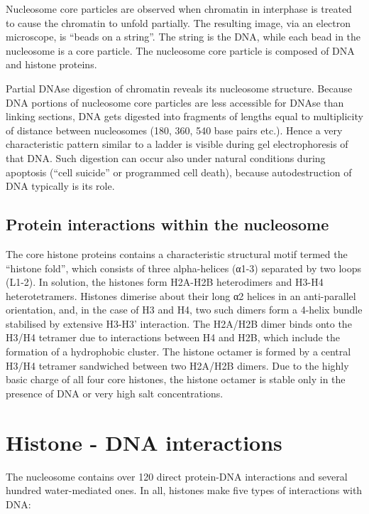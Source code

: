 Nucleosome core particles are observed when chromatin in interphase is treated to cause the chromatin to unfold partially. The resulting image, via an electron microscope, is ``beads on a string''. The string is the DNA, while each bead in the nucleosome is a core particle. The nucleosome core particle is composed of DNA and histone proteins.

Partial DNAse digestion of chromatin reveals its nucleosome structure. Because DNA portions of nucleosome core particles are less accessible for DNAse than linking sections, DNA gets digested into fragments of lengths equal to multiplicity of distance between nucleosomes (180, 360, 540 base pairs etc.). Hence a very characteristic pattern similar to a ladder is visible during gel electrophoresis of that DNA. Such digestion can occur also under natural conditions during apoptosis (``cell suicide'' or programmed cell death), because autodestruction of DNA typically is its role.

\hypertarget{protein-interactions-within-the-nucleosome}{%
\subsection{Protein interactions within the nucleosome}\label{protein-interactions-within-the-nucleosome}}

The core histone proteins contains a characteristic structural motif termed the ``histone fold'', which consists of three alpha-helices (α1-3) separated by two loops (L1-2). In solution, the histones form H2A-H2B heterodimers and H3-H4 heterotetramers. Histones dimerise about their long α2 helices in an anti-parallel orientation, and, in the case of H3 and H4, two such dimers form a 4-helix bundle stabilised by extensive H3-H3' interaction. The H2A/H2B dimer binds onto the H3/H4 tetramer due to interactions between H4 and H2B, which include the formation of a hydrophobic cluster. The histone octamer is formed by a central H3/H4 tetramer sandwiched between two H2A/H2B dimers. Due to the highly basic charge of all four core histones, the histone octamer is stable only in the presence of DNA or very high salt concentrations.

\hypertarget{histone---dna-interactions}{%
\section{Histone - DNA interactions}\label{histone---dna-interactions}}

The nucleosome contains over 120 direct protein-DNA interactions and several hundred water-mediated ones. In all, histones make five types of interactions with DNA:

